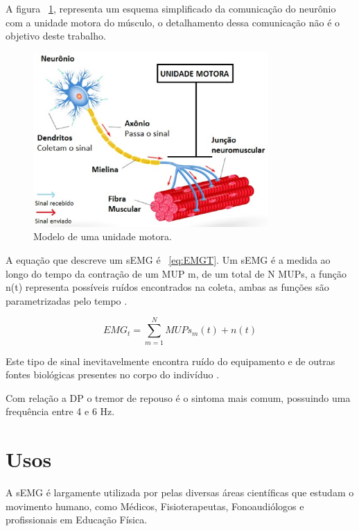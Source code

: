 A figura ~\ref{UnidadeMotora}, representa um esquema simplificado da comunicação do neurônio com a unidade motora do músculo, o detalhamento dessa comunicação não é o objetivo deste trabalho.

\begin{figure}[!htb]
   \centering
    \includegraphics[width=0.8\textwidth]{figuras/motor-neuron.eps}
    \caption{Modelo de uma unidade motora.}
    \label{UnidadeMotora}
\end{figure}

A equação que descreve um sEMG é ~\ref{eq:EMGT}. Um sEMG é a medida ao longo do tempo da contração de um MUP m, de um total de N MUPs, a função n(t) representa possíveis ruídos encontrados na coleta, ambas as funções são parametrizadas pelo tempo \cite{yousefi2014characterizing}.

\begin{equation} \label{eq:EMGT}
    EMG_{t} =\sum_{m=1}^{N} MUPs_{m}(t)+n(t)
\end{equation}

Este tipo de sinal inevitavelmente encontra ruído do equipamento e de outras fontes biológicas presentes no corpo do indivíduo \cite{yousefi2014characterizing}.

Com relação a DP o tremor de repouso é o sintoma mais comum, possuindo uma frequência entre 4 e 6 Hz.
\cite{jankovic2008parkinson}

\section{Usos}
A sEMG é largamente utilizada por pelas diversas áreas científicas que estudam o movimento humano, como Médicos, Fisioterapeutas, Fonoaudiólogos e profissionais em Educação Física\cite{nascimento2012surface}.

